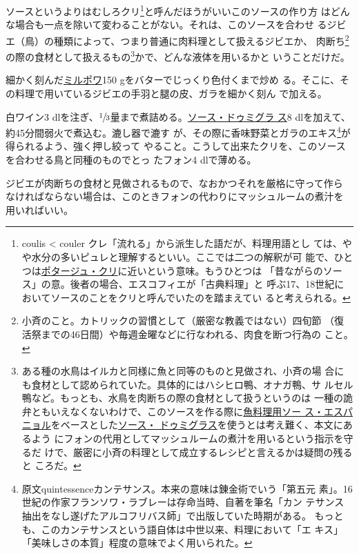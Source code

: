 
ソースというよりはむしろクリ\footnote{coulis \textless{} couler
  クレ「流れる」から派生した語だが、料理用語とし
  ては、やや水分の多いピュレと理解するといい。ここでは二つの解釈が可
  能で、ひとつは\href{}{ポタージュ・クリ}に近いという意味。もうひとつは
  「昔ながらのソース」の意。後者の場合、エスコフィエが「古典料理」と
  呼ぶ17、18世紀においてソースのことをクリと呼んでいたのを踏まえてい
  ると考えられる。}と呼んだほうがいいこのソースの作り方
はどんな場合も一点を除いて変わることがない。それは、このソースを合わせ
るジビエ（鳥）の種類によって、つまり普通に肉料理として扱えるジビエか、
肉断ち\footnote{小斉のこと。カトリックの習慣として（厳密な教義ではない）四旬節
  （復活祭までの46日間）や毎週金曜などに行なわれる、肉食を断つ行為の
  こと。}の際の食材として扱えるもの\footnote{ある種の水鳥はイルカと同様に魚と同等のものと見做され、小斉の場
  合にも食材として認められていた。具体的にはハシヒロ鴨、オナガ鴨、サ
  ルセル鴨など。もっとも、水鳥を肉断ちの際の食材として扱うというのは
  一種の詭弁ともいえなくないわけで、このソースを作る際に\protect\hyperlink{sauce-espagnole-maigre}{魚料理用ソー
  ス・エスパニョル}をベースとした\protect\hyperlink{sauce-demi-glace}{ソース・
  ドゥミグラス}を使うとは考え難く、本文にあるよう
  にフォンの代用としてマッシュルームの煮汁を用いるという指示を守るだ
  けで、厳密に小斉の料理として成立するレシピと言えるかは疑問の残ると
  ころだ。}かで、どんな液体を用いるかと いうことだけだ。

細かく刻んだ\protect\hyperlink{mirepoix}{ミルポワ}150
gをバターでじっくり色付くまで炒め
る。そこに、その料理で用いているジビエの手羽と腿の皮、ガラを細かく刻ん
で加える。

白ワイン3
dlを注ぎ、\(\sfrac{1}{3}\)量まで煮詰める。\protect\hyperlink{sauce-demi-glace}{ソース・ドゥミグラ
ス}8 dlを加えて、約45分間弱火で煮込む。漉し器で漉す
が、その際に香味野菜とガラのエキス\footnote{原文quintessenceカンテサンス。本来の意味は錬金術でいう「第五元
  素」。16世紀の作家フランソワ・ラブレーは存命当時、自著を筆名「カン
  テサンス抽出をなし遂げたアルコフリバス師」で出版していた時期がある。
  もっとも、このカンテサンスという語自体は中世以来、料理において「エ
  キス」「美味しさの本質」程度の意味でよく用いられた。}が得られるよう、強く押し絞って
やること。こうして出来たクリを、このソースを合わせる鳥と同種のものでとっ
たフォン4 dlで薄める。

ジビエが肉断ちの食材と見做されるもので、なおかつそれを厳格に守って作ら
なければならない場合は、このときフォンの代わりにマッシュルームの煮汁を
用いればいい。

